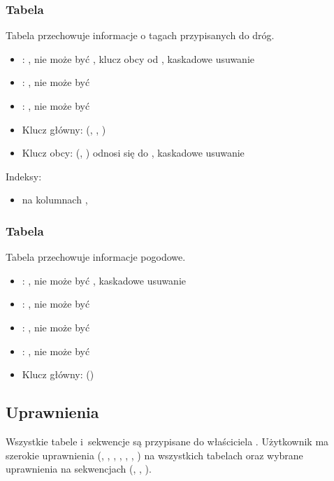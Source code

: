 \subsubsection{Tabela }
Tabela przechowuje informacje o tagach przypisanych do dróg.
\begin{itemize}
    \item {}: , nie może być , klucz obcy od , kaskadowe usuwanie
    \item {}: , nie może być 
    \item {}: , nie może być 
    \item Klucz główny: (, , )
    \item Klucz obcy: (, ) odnosi się do , kaskadowe usuwanie
\end{itemize}
Indeksy:
\begin{itemize}
    \item {} na kolumnach , 
\end{itemize}

\subsubsection{Tabela }
Tabela przechowuje informacje pogodowe.
\begin{itemize}
    \item {}: , nie może być , kaskadowe usuwanie
    \item {}: , nie może być 
    \item {}: , nie może być 
    \item {}: , nie może być 
    \item Klucz główny: ()
\end{itemize}

\subsection{Uprawnienia}
Wszystkie tabele i~sekwencje są przypisane do właściciela .
Użytkownik  ma szerokie uprawnienia (, , , , , , ) na wszystkich tabelach oraz wybrane uprawnienia na sekwencjach (, , ).

